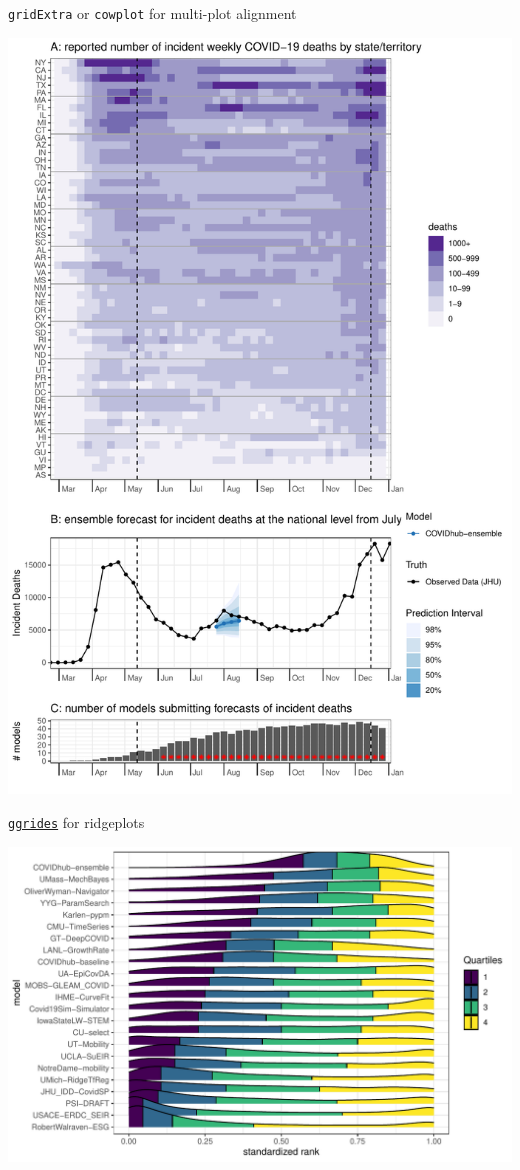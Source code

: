 \documentclass[table]{beamer}\usepackage[]{graphicx}\usepackage[]{color}
\begin{document}
\begin{frame}[fragile]{{\tt gridExtra} or {\tt cowplot} for multi-plot alignment}

\includegraphics[width=.5\textwidth]{figure-static/data-and-forecast}

\end{frame}


\begin{frame}[fragile]{\href{https://wilkelab.org/ggridges/}{{\tt ggrides}} for ridgeplots}

\includegraphics[width=\textwidth]{figure-static/fig-model-ranks}

\end{frame}
\end{document}
